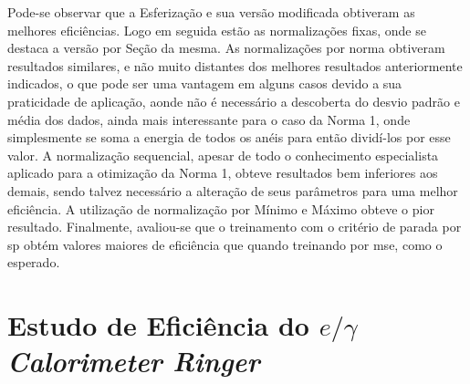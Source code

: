 Pode-se observar que a Esferização e sua versão
modificada obtiveram as melhores eficiências. Logo em seguida estão as
normalizações fixas, onde se destaca a versão por Seção da mesma. As
normalizações por norma obtiveram resultados similares, e não muito distantes
dos melhores resultados anteriormente indicados, o que pode ser uma vantagem em
alguns casos devido a sua praticidade de aplicação, aonde não é necessário a
descoberta do desvio padrão e média dos dados, ainda mais interessante para o
caso da Norma 1, onde simplesmente se soma a energia de todos os anéis para
então dividí-los por esse valor. A normalização sequencial, apesar de todo o
conhecimento especialista aplicado para a otimização da Norma 1, obteve
resultados bem inferiores aos demais, sendo talvez necessário a alteração de
seus parâmetros para uma melhor eficiência. A utilização de normalização por
Mínimo e Máximo obteve o pior resultado. Finalmente, avaliou-se que o
treinamento com o critério de parada por \gls{sp} obtém valores maiores de
eficiência que quando treinando por \gls{mse}, como o esperado.


\section[Estudo de Eficiência do \emph{eGamma Calorimeter Ringer}]{Estudo 
de Eficiência do $e/\gamma$ \emph{Calorimeter Ringer}}
\label{sec:efic_egcalo}

